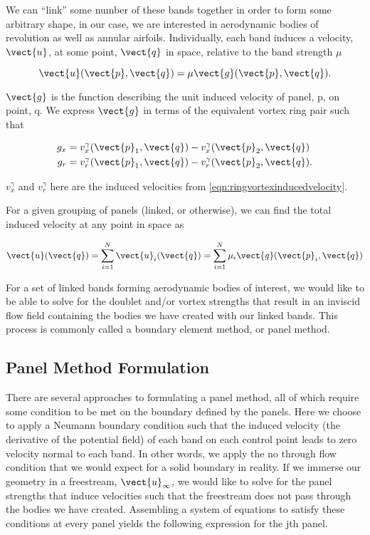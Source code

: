 We can ``link'' some number of these bands together in order to form some arbitrary shape,
in our case, we are interested in aerodynamic bodies of revolution as well as annular airfoils.
Individually, each band induces a velocity, \(\vect{u}\), at some point,
\(\vect{q}\) in space, relative to the band strength \(\mu\)

\begin{equation}
    \vect{u}(\vect{p},\vect{q}) = \mu \vect{g}(\vect{p},\vect{q}).
\end{equation}

\where \(\vect{g}\) is the function describing the unit induced velocity of panel, p, on point, q.
We express \(\vect{g}\) in terms of the equivalent vortex ring pair such that

\begin{equation}
    \label{eqn:unitdoubletinducedvelocity}
    \begin{aligned}
        g_x &=  v^\gamma_x(\vect{p}_1, \vect{q}) -  v^\gamma_x(\vect{p}_2, \vect{q}) \\
        g_r &=  v^\gamma_r(\vect{p}_1, \vect{q}) -  v^\gamma_r(\vect{p}_2, \vect{q}).
    \end{aligned}
\end{equation}

\where \(v^\gamma_x\) and \(v^\gamma_r\) here are the induced velocities from \cref{eqn:ringvortexinducedvelocity}.

For a given grouping of panels (linked, or otherwise),
we can find the total induced velocity at any point in space as

\begin{equation}
    \vect{u}(\vect{q}) = \sum_{i=1}^N \vect{u}_i(\vect{q})    =\sum_{i=1}^N \mu_i \vect{g}(\vect{p}_i,\vect{q})
\end{equation}

\noindent For a set of linked bands forming aerodynamic bodies of interest,
we would like to be able to solve for the doublet and/or vortex strengths that result in
an inviscid flow field containing the bodies we have created with our linked bands.
This process is commonly called a boundary element method, or panel method.

\subsection{Panel Method Formulation}

There are several approaches to formulating a panel method, all of which require some condition to be met on the boundary defined by the panels.
Here we choose to apply a Neumann boundary condition such that the induced velocity (the derivative of the potential field) of each band on each
control point leads to zero velocity normal to each band.
In other words, we apply the no through flow condition that we would expect for a solid boundary in reality.
If we immerse our geometry in a freestream, \(\vect{u}_\infty\),
we would like to solve for the panel strengths that induce velocities such that
the freestream does not pass through the bodies we have created.
Assembling a system of equations to satisfy these conditions at every panel yields the
following expression for the jth panel.

